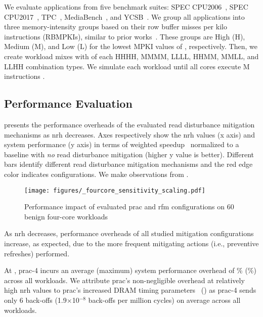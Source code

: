 We evaluate applications from five benchmark suites: SPEC CPU2006~\cite{spec2006}, SPEC CPU2017~\cite{spec2017}, TPC~\cite{tpc}, MediaBench~\cite{fritts2009media}, and YCSB~\cite{ycsb}. We group all applications into three memory-intensity groups based on their row buffer misses per kilo instructions (RBMPKIs), similar to prior works~\cite{olgun2024abacus, bostanci2024comet}. These groups are High (H), Medium (M), and Low (L) for the lowest MPKI values of , respectively. Then, we create  workload mixes with  of each HHHH, MMMM, LLLL, HHMM, MMLL, and LLHH combination types. We simulate each workload until all cores execute M instructions .      

\subsection{Performance Evaluation}

 presents the performance overheads of the evaluated read disturbance mitigation mechanisms as \gls{nrh} decreases.
Axes respectively show the \gls{nrh} values (x axis) and system performance (y axis) in terms of weighted speedup~\cite{eyerman2008systemlevel, snavely2000symbiotic} normalized to a baseline with \emph{no} read disturbance mitigation (higher y value is better).
Different bars identify different read disturbance mitigation mechanisms and the red edge color indicates  configurations.
We make  observations from .

\begin{figure}[h]
\centering
\texttt{[image: figures/\_fourcore\_sensitivity\_scaling.pdf]}
\caption{Performance impact of evaluated \gls{prac} and \gls{rfm} configurations on 60 benign four-core workloads}
\label{fig:sensitivity_performance}
\end{figure}

As \gls{nrh} decreases, performance overheads of all studied mitigation configurations increase, as expected, due to the more frequent mitigating actions (i.e., preventive refreshes) performed.

At , \gls{prac}-4 incurs an average (maximum) system performance overhead of \% (\%) across all workloads.
We attribute \gls{prac}'s non-negligible overhead at relatively high \gls{nrh} values to \gls{prac}'s increased DRAM timing parameters~\cite{jedec2024jesd795c} () as \gls{prac}-4 sends only 6 back-offs (1.9$\times$10$^{-8}$ back-offs per million cycles) on average across all workloads.

